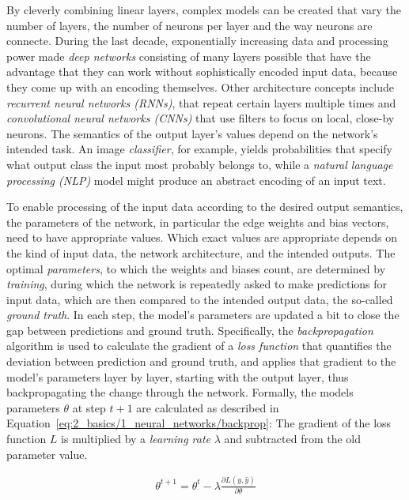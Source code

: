 By cleverly combining linear layers, complex models can be created that vary the number of layers, the number of neurons per layer and the way neurons are connecte. During the last decade, exponentially increasing data and processing power made \emph{deep networks} consisting of many layers possible that have the advantage that they can work without sophistically encoded input data, because they come up with an encoding themselves. Other architecture concepts include \emph{recurrent neural networks (RNNs)}, that repeat certain layers multiple times and \emph{convolutional neural networks (CNNs)} that use filters to focus on local, close-by neurons. The semantics of the output layer's values depend on the network's intended task. An image \emph{classifier}, for example, yields probabilities that specify what output class the input most probably belongs to, while a \emph{natural language processing (NLP)} model might produce an abstract encoding of an input text.

To enable processing of the input data according to the desired output semantics, the parameters of the network, in particular the edge weights and bias vectors, need to have appropriate values. Which exact values are appropriate depends on the kind of input data, the network architecture, and the intended outputs. The optimal \emph{parameters}, to which the weights and biases count, are determined by \emph{training}, during which the network is repeatedly asked to make predictions for input data, which are then compared to the intended output data, the so-called \emph{ground truth}. In each step, the model's parameters are updated a bit to close the gap between predictions and ground truth. Specifically, the \emph{backpropagation} algorithm is used to calculate the gradient of a \emph{loss function} that quantifies the deviation between prediction and ground truth, and applies that gradient to the model's parameters layer by layer, starting with the output layer, thus backpropagating the change through the network. Formally, the models parameters $\theta$ at step $t+1$ are calculated as described in Equation~\ref{eq:2_basics/1_neural_networks/backprop}: The gradient of the loss function $L$ is multiplied by a \emph{learning rate} $\lambda$ and subtracted from the old parameter value.

\begin{align}
    \theta^{t+1} = \theta^t - \lambda \frac{\partial L(y, \hat{y})}{\partial \theta}
    \label{eq:2_basics/1_neural_networks/backprop}
\end{align}

